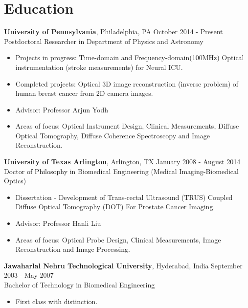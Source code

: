 \documentclass{my_cv}
\begin{document}
\section{Education}
\begin{flushleft}  
\textbf{University of Pennsylvania}, Philadelphia, PA  \hfill October 2014 - Present \\ 
Postdoctoral Researcher in Department of Physics and Astronomy \\ 
\vspace{-2.5mm}
\begin{itemize}\itemsep -2pt
\item Projects in progress: Time-domain and Frequency-domain(100MHz) Optical instrumentation (stroke measurements) for Neural ICU.   
\item Completed projects: Optical 3D image reconstruction (inverse problem) of human breast cancer from 2D camera images. 
\item Advisor: Professor Arjun Yodh
\item Areas of focus: Optical Instrument Design, Clinical Measurements, Diffuse Optical Tomography, Diffuse Coherence Spectroscopy and Image Reconstruction.
\end{itemize}


\textbf{University of Texas Arlington}, Arlington, TX \hfill January 2008 - August 2014 \\ 
Doctor of Philosophy in Biomedical Engineering (Medical Imaging-Biomedical Optics) \\
\vspace{-2.5mm}
\begin{itemize}\itemsep -2pt
\item Dissertation -  Development of Trans-rectal Ultrasound (TRUS) Coupled Diffuse Optical Tomography (DOT) For Prostate Cancer Imaging.
\item Advisor: Professor Hanli Liu 
\item Areas of focus: Optical Probe Design, Clinical Measurements, Image Reconstruction and Image Processing.
\end{itemize}
 
\textbf{Jawaharlal Nehru Technological University}, Hyderabad, India \hfill September 2003 - May 2007\\
Bachelor of Technology in Biomedical Engineering \\ 
\vspace{-3mm}
\begin{itemize}
\setlength\itemsep{0em} 
\item First class with distinction.
\end{itemize}
\end{flushleft}  
 
\end{document}
